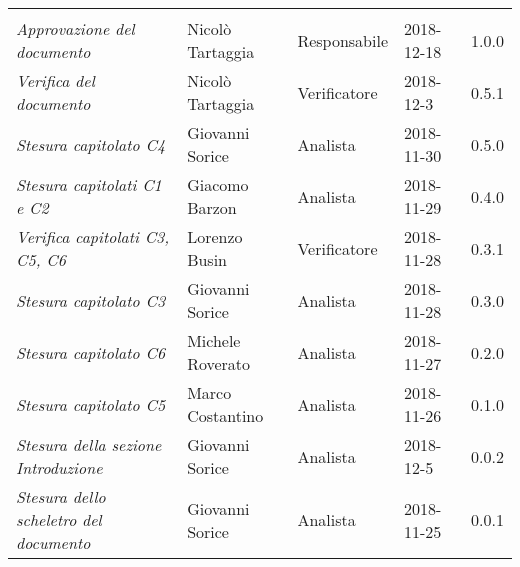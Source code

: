 \newpage 
\section*{}
\begin{table}[H]
	\centering
	\begin{tabular}{p{4cm}|C{3cm}|C{3cm}|R{2.5cm}|R{2cm}}
		
		 & & & & \\
		
		
		\emph{Approvazione del documento} & Nicolò Tartaggia & Responsabile & 2018-12-18 & 1.0.0 \\
		\hline
		
		\emph{Verifica del documento} & Nicolò Tartaggia & Verificatore & 2018-12-3 & 0.5.1 \\
		\hline
		
		\emph{Stesura capitolato C4 } & Giovanni Sorice & Analista & 2018-11-30 & 0.5.0 \\
		\hline
		
		\emph{Stesura capitolati C1 e C2} & Giacomo Barzon & Analista & 2018-11-29 & 0.4.0 \\
		\hline
		
		\emph{Verifica capitolati C3, C5, C6} & Lorenzo Busin & Verificatore & 2018-11-28 & 0.3.1 \\
		\hline
		
		\emph{Stesura capitolato C3 } & Giovanni Sorice & Analista & 2018-11-28 & 0.3.0 \\
		\hline
		
		\emph{Stesura capitolato C6 } & Michele Roverato & Analista & 2018-11-27 & 0.2.0 \\
		\hline
		
		\emph{Stesura capitolato C5 } & Marco Costantino & Analista & 2018-11-26 & 0.1.0 \\
		\hline
		
		\emph{Stesura della sezione Introduzione } & Giovanni Sorice & Analista & 2018-12-5 & 0.0.2 \\
		\hline
		
		\emph{Stesura dello scheletro del documento} & Giovanni Sorice & Analista & 2018-11-25 & 0.0.1 \\
		
	\end{tabular}
	
\end{table}


\clearpage